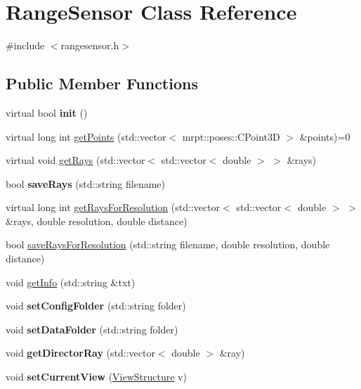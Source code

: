 \hypertarget{classRangeSensor}{}\section{Range\+Sensor Class Reference}
\label{classRangeSensor}


{\ttfamily \#include $<$rangesensor.\+h$>$}

\subsection*{Public Member Functions}
\begin{DoxyCompactItemize}
\item 
virtual bool {\bfseries init} ()\hypertarget{classRangeSensor_a0fa9437a62cec4c93ea3f74472d67d3c}{}\label{classRangeSensor_a0fa9437a62cec4c93ea3f74472d67d3c}

\item 
virtual long int \hyperlink{classRangeSensor_a41e0ee652ab717ed803271f944f229d2}{get\+Points} (std\+::vector$<$ mrpt\+::poses\+::\+C\+Point3D $>$ \&points)=0
\item 
virtual void \hyperlink{classRangeSensor_a3c66f28c18e3fe8ffba809a8d9d83f62}{get\+Rays} (std\+::vector$<$ std\+::vector$<$ double $>$ $>$ \&rays)
\item 
bool {\bfseries save\+Rays} (std\+::string filename)\hypertarget{classRangeSensor_a0bdf89af52158d28f030523254509dbe}{}\label{classRangeSensor_a0bdf89af52158d28f030523254509dbe}

\item 
virtual long int \hyperlink{classRangeSensor_a29bca03aff4a2392ab34ded51d74ab92}{get\+Rays\+For\+Resolution} (std\+::vector$<$ std\+::vector$<$ double $>$ $>$ \&rays, double resolution, double distance)
\item 
bool \hyperlink{classRangeSensor_a9d8589690833d9294092449b8daf5ce7}{save\+Rays\+For\+Resolution} (std\+::string filename, double resolution, double distance)
\item 
void \hyperlink{classRangeSensor_afdccf7af7a35e9d83fbb5f0dbab1019d}{get\+Info} (std\+::string \&txt)
\item 
void {\bfseries set\+Config\+Folder} (std\+::string folder)\hypertarget{classRangeSensor_a61c318a0c38450e8c89b0aeeccee350d}{}\label{classRangeSensor_a61c318a0c38450e8c89b0aeeccee350d}

\item 
void {\bfseries set\+Data\+Folder} (std\+::string folder)\hypertarget{classRangeSensor_a116cb7188af13268484e4f7aee1d33de}{}\label{classRangeSensor_a116cb7188af13268484e4f7aee1d33de}

\item 
void {\bfseries get\+Director\+Ray} (std\+::vector$<$ double $>$ \&ray)\hypertarget{classRangeSensor_adfba7fd830d21af871359b959d1ac44d}{}\label{classRangeSensor_adfba7fd830d21af871359b959d1ac44d}

\item 
void {\bfseries set\+Current\+View} (\hyperlink{classViewStructure}{View\+Structure} v)\hypertarget{classRangeSensor_a4955219c175c9ba2da8a0cb743bb703f}{}\label{classRangeSensor_a4955219c175c9ba2da8a0cb743bb703f}

\end{DoxyCompactItemize}

